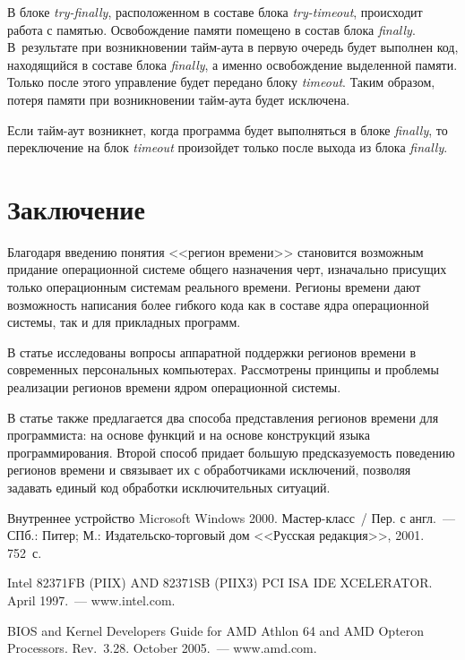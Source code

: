\begin{multicols}{2}
   В блоке \textit{try-finally}, расположенном в составе блока \textit{try-timeout}, происходит работа с памятью.
Осво\-бож\-де\-ние памяти помещено в состав блока \textit{finally}. В~результате при возникновении тайм-аута
в первую очередь будет выполнен код, находящийся в составе блока \textit{finally}, а именно
освобождение выделенной памяти. Только после этого управление будет передано блоку \textit{timeout}.
Таким образом, потеря памяти при возникновении тайм-аута будет исключена.

   Если тайм-аут возникнет, когда программа будет выполняться в блоке \textit{finally}, то переключение
на блок \textit{timeout} произойдет только после выхода из блока \textit{finally}.

\section{Заключение}

   Благодаря введению понятия <<регион времени>> становится возможным придание
операционной системе общего назначения черт, изначально присущих только операционным
системам реального времени. Регионы времени дают возможность написания более гибкого кода
как в составе ядра операционной системы, так и для прикладных программ.

   В статье исследованы вопросы аппаратной поддержки регионов времени в современных
персональных компьютерах. Рассмотрены принципы и проблемы реализации регионов времени
ядром операционной системы.

   В статье также предлагается два способа представления регионов времени для программиста:
на основе функций и на основе конструкций языка программирования. Второй способ придает
большую предсказуемость поведению регионов времени и связывает их с обработчиками
исключений, позволяя задавать единый код обработки исключительных ситуаций.

{\small\frenchspacing
{%
\begin{thebibliography}{99}


Внутреннее устройство Microsoft Windows 2000. Мастер-класс~/ Пер. с англ.~--- СПб.: Питер; М.:
Издательско-торговый дом <<Русская редакция>>, 2001.  752~с.


Intel 82371FB (PIIX) AND 82371SB (PIIX3) PCI ISA IDE XCELERATOR. April 1997.~---  {\sf
www.intel.com.}

BIOS and Kernel Developers Guide for AMD Athlon 64 and AMD Opteron Processors. Rev.~3.28.
October 2005.~--- {\sf www.amd.com.}



\end{thebibliography}}}
\end{multicols}
